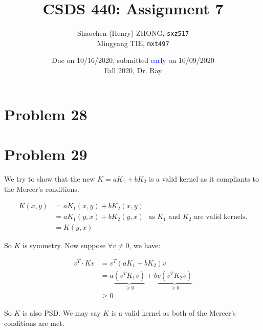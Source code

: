 \documentclass[12pt]{article}
\newcommand{\ilcode}{\texttt}
\begin{document}
\title{\textbf{CSDS 440: Assignment 7}}

\author{Shaochen (Henry) ZHONG, \ilcode{sxz517} \\ Mingyang TIE, \ilcode{mxt497}}
\date{Due on 10/16/2020, submitted \textcolor{blue}{early} on 10/09/2020 \\ Fall 2020, Dr. Ray}
\maketitle


\section{Problem 28}

\section{Problem 29}

We try to show that the new $K = aK_1 + bK_2$ is a valid kernel as it compliants to the Mercer's conditions.

\begin{align*}
    K(x, y) &= aK_1(x, y) + bK_2(x, y) \\
    &= aK_1(y, x) + bK_2(y, x) \ \ \ \text{as $K_1$ and $K_2$ are valid kernels.} \\
    &= K(y, x)
\end{align*}

So $K$ is symmetry. Now suppose $\forall v \neq 0$, we have:

\begin{align*}
    v^T \cdot K v &= v^T (aK_1 + bK_2)v \\
    &= a\underbrace{(v^T K_1 v)}_{\geq 0} + b\underbrace{v(v^T K_2 v)}_{\geq 0}  \\
    &\geq 0
\end{align*}

So $K$ is also PSD. We may say $K$ is a valid kernel as both of the Mercer's conditions are met.

\end{document}
